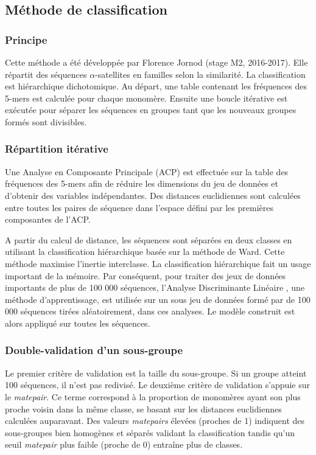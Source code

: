 \documentclass[12pt,a4paper]{article}
\begin{document}
\subsection{Méthode de classification}
	\subsubsection{Principe}
Cette méthode a été développée par Florence Jornod (stage M2, 2016-2017). Elle répartit des séquences $\alpha$-satellites en familles selon la similarité. La classification est hiérarchique dichotomique. Au départ, une table contenant les fréquences des 5-mers est calculée pour chaque monomère. Ensuite une boucle itérative est exécutée pour séparer les séquences en groupes tant que les nouveaux groupes formés sont divisibles.

	\subsubsection{Répartition itérative}
Une Analyse en Composante Principale (ACP) est effectuée sur la table des fréquences des 5-mers afin de réduire les dimensions du jeu de données et d’obtenir des variables indépendantes. Des distances euclidiennes sont calculées entre toutes les paires de séquence dans l’espace défini par les premières composantes de l’ACP. 

A partir du calcul de distance, les séquences sont séparées en deux classes en utilisant la classification hiérarchique basée sur la méthode de Ward. Cette méthode maximise l’inertie interclasse. La classification hiérarchique fait un usage important de la mémoire. Par conséquent, pour traiter des jeux de données importants de plus de 100 000 séquences, l’Analyse Discriminante Linéaire , une méthode d’apprentissage, est utilisée sur un sous jeu de données formé par de 100 000 séquences tirées aléatoirement, dans ces analyses. Le modèle construit est alors appliqué sur toutes les séquences.

	\subsubsection{Double-validation d'un sous-groupe}
Le premier critère de validation est la taille du sous-groupe. Si un groupe atteint 100 séquences, il n'est pas redivisé. Le deuxième critère de validation s'appuie sur le \textit{matepair}. Ce terme correspond à la proportion de monomères ayant son plus proche voisin dans la même classe, se basant sur les distances euclidiennes calculées auparavant. Des valeurs \textit{matepairs} élevées (proches de 1) indiquent des sous-groupes bien homogènes et séparés validant la classification tandis qu’un seuil \textit{matepair} plus faible (proche de 0) entraîne plus de classes.
\end{document}
